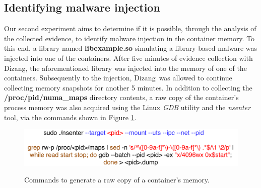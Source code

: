 \documentclass[conference]{IEEEtran}
\newcommand{\marcos}[1]{{\color{green}{MARCOS: #1}}}
\newcommand{\fancyname}{Dizang}
\begin{document}
\subsection{Identifying malware injection}

Our second experiment aims to determine if it is possible, through the analysis of the collected evidence, to identify malware injection in the container memory.
%
To this end, a library named \textbf{libexample.so} simulating a library-based malware was injected into one of the containers.
%
After five minutes of evidence collection with \fancyname, the aforementioned library was injected into the memory of one of the containers. 
%
Subsequently to the injection, \fancyname\ was allowed to continue collecting memory snapshots for another 5 minutes.
%
In addition to collecting the \textbf{/proc/pid/numa\_maps} directory contents, a raw copy of the container's process memory was also acquired using the Linux \textit{GDB} utility and the \textit{nsenter} tool, via the commands shown in Figure \ref{fig:comando-copia}.



\begin{figure}[htb!]
\footnotesize
\caption{Commands to generate a raw copy of a container's memory.}
\includegraphics[scale=0.50]{comando-copia-memoria-gdb.pdf}
\centering
\label{fig:comando-copia}
\end{figure}
\end{document}
